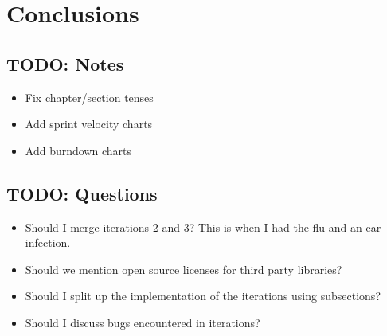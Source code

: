 \chapter{Conclusions}
\section{TODO: Notes}
\begin{itemize}
\item Fix chapter/section tenses
\item Add sprint velocity charts
\item Add burndown charts
\end{itemize}

\section{TODO: Questions}
\begin{itemize}
\item Should I merge iterations 2 and 3? This is when I had the flu and an ear infection.
\item Should we mention open source licenses for third party libraries?
\item Should I split up the implementation of the iterations using subsections?
\item Should I discuss bugs encountered in iterations?
\end{itemize}

